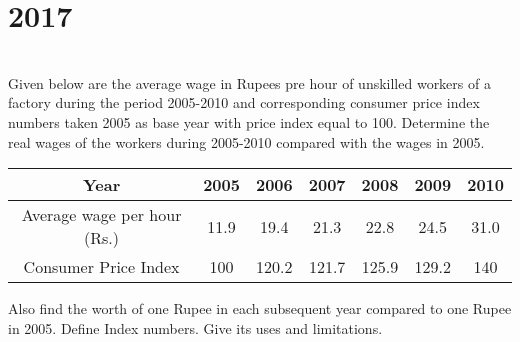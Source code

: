 \section*{2017}
\vspace{-.5cm}
\hrulefill \smallskip\\
 Given below are the average wage in Rupees pre hour of unskilled workers of a factory during the period 2005-2010 and corresponding consumer price index numbers taken 2005 as base year with price index equal to 100. Determine the real wages of the workers during 2005-2010 compared with the wages in 2005.
\begin{center}
    \begin{tabular}{|*{7}{c|}}\hline
        Year & 2005 & 2006 & 2007 & 2008 & 2009 & 2010 \\ \hline
        Average wage per hour (Rs.) & 11.9 & 19.4 & 21.3 & 22.8 & 24.5 & 31.0 \\
        Consumer Price Index & 100 & 120.2 & 121.7 & 125.9 & 129.2 & 140\\\hline
    \end{tabular}
\end{center} Also find the worth of one Rupee in each subsequent year compared to one Rupee in 2005.
\myline
{} Define Index numbers. Give its uses and limitations.